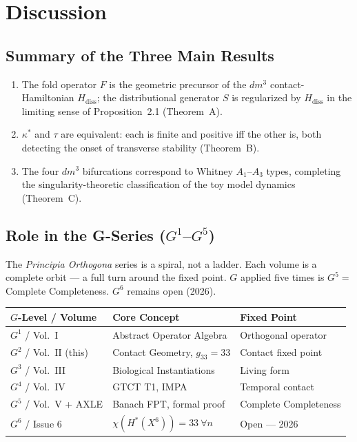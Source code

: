 \documentclass[11pt]{article}
\theoremstyle{boxed}
\begin{document}
\section{Discussion}

\subsection{Summary of the Three Main Results}

\begin{enumerate}
  \item The fold operator $F$ is the geometric precursor of the $dm^3$ contact-Hamiltonian
        $H_{\mathrm{diss}}$; the distributional generator $S$ is regularized by
        $H_{\mathrm{diss}}$ in the limiting sense of Proposition~2.1 (Theorem~A).
  \item $\kappa^{*}$ and $\tau$ are equivalent: each is finite and positive iff the
        other is, both detecting the onset of transverse stability (Theorem~B).
  \item The four $dm^3$ bifurcations correspond to Whitney $A_1$--$A_3$ types,
        completing the singularity-theoretic classification of the toy model dynamics
        (Theorem~C).
\end{enumerate}

\subsection{Role in the G-Series ($G^1$--$G^5$)}

The \emph{Principia Orthogona} series is a spiral, not a ladder. Each volume is a
complete orbit --- a full turn around the fixed point. $G$ applied five times is
$G^5 = $ Complete Completeness. $G^6$ remains open (2026).

\begin{center}
\begin{tabular}{lll}
\toprule
\textbf{$G$-Level / Volume} & \textbf{Core Concept} & \textbf{Fixed Point}\\
\midrule
$G^1$ / Vol.~I               & Abstract Operator Algebra        & Orthogonal operator\\
$G^2$ / Vol.~II (this)       & Contact Geometry, $g_{33} = 33$  & Contact fixed point\\
$G^3$ / Vol.~III             & Biological Instantiations         & Living form\\
$G^4$ / Vol.~IV              & GTCT T1, IMPA                     & Temporal contact\\
$G^5$ / Vol.~V + AXLE        & Banach FPT, formal proof          & Complete Completeness\\
$G^6$ / Issue 6              & $\chi(H^{*}(X^{6})) = 33\ \forall n$ & Open --- 2026\\
\bottomrule
\end{tabular}
\end{center}
\end{document}
